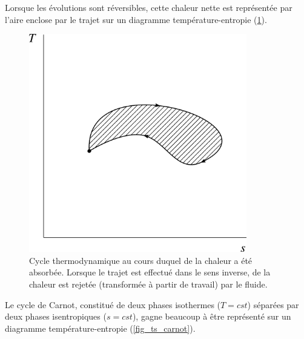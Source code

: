 		Lorsque les évolutions sont réversibles, cette chaleur nette est représentée par l’aire enclose par le trajet sur un diagramme température-entropie (\cref{fig_ts_cycle}).

		\begin{figure}
			\begin{center}
				\includegraphics[width=9.5cm]{images/ts_cycle.png}
			\end{center}
			\caption{Cycle thermodynamique au cours duquel de la chaleur a été absorbée. Lorsque le trajet est effectué dans le sens inverse, de la chaleur est rejetée (transformée à partir de travail) par le fluide.}
			\label{fig_ts_cycle}
		\end{figure}

		\clearfloats
		Le cycle de Carnot, constitué de deux phases isothermes ($T = cst$) séparées par deux phases isentropiques ($s = cst$), gagne beaucoup à être représenté sur un diagramme température-entropie (\cref{fig_ts_carnot}).

